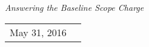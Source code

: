 \renewcommand*\familydefault{\sfdefault}
{\sffamily
\vfill
\vspace{4cm}
\begin{figure}[H]
  \begin{center}
  \end{center}
\end{figure}

\begin{center}
  \large
  \emph{\Large{Answering the Baseline Scope Charge}}

  \begin{tabular}{rl}
  May 31, 2016 \\
  \end{tabular}
\end{center}

\vspace{2cm}

\begin{figure}[H]
  \begin{center}
  \end{center}
\end{figure}
}


\vfill
\renewcommand*\familydefault{\rmdefault}
